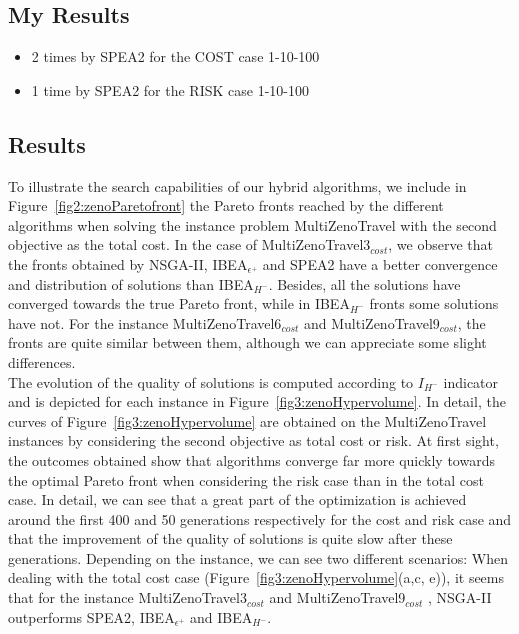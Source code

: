 \documentclass{llncs}
\begin{document}
\subsection{My Results}
\begin{itemize}
 \item 2 times by SPEA2 for the COST case 1-10-100
 \item 1 time by SPEA2 for the RISK case 1-10-100
\end{itemize}


\subsection{Results}
To illustrate the search capabilities of our hybrid algorithms, we include in Figure~\ref{fig2:zenoParetofront} the Pareto fronts reached by the different algorithms
when solving the instance problem MultiZenoTravel with the second objective as the  total cost.
In the case of MultiZenoTravel3$_{cost}$, we observe that the fronts obtained by  NSGA-II, IBEA$_{\epsilon^+}$ and SPEA2 have a better convergence and distribution of solutions than IBEA$_{H^-}$. 
Besides, all the solutions have converged towards the true Pareto front, while in IBEA$_{H^-}$ fronts some 
solutions have not. For the instance MultiZenoTravel6$_{cost}$ and  MultiZenoTravel9$_{cost}$, the fronts are quite similar between them, although we can appreciate some slight differences.\\
The evolution of the quality of solutions is computed according to $I_{H^-}$ indicator and is depicted for each instance in Figure~\ref{fig3:zenoHypervolume}.
In detail, the curves of Figure~\ref{fig3:zenoHypervolume} are  obtained on the  MultiZenoTravel instances by considering the second objective as total cost or risk.
At first sight, the outcomes obtained show that algorithms converge far more quickly towards the optimal Pareto front  when considering the
 risk case than  in the total cost case.
In detail, we can see that a great part of the optimization is achieved around the first 400  and 50 generations respectively for the cost and risk case and that the improvement of the quality of solutions is quite slow after these generations.
Depending on the instance, we can see two different scenarios:
When dealing with the total cost case (Figure~\ref{fig3:zenoHypervolume}(a,c, e)), it seems that for the instance MultiZenoTravel3$_{cost}$ and MultiZenoTravel9$_{cost}$ ,  NSGA-II outperforms SPEA2, IBEA$_{\epsilon^+}$ and IBEA$_{H^-}$.
\end{document}
